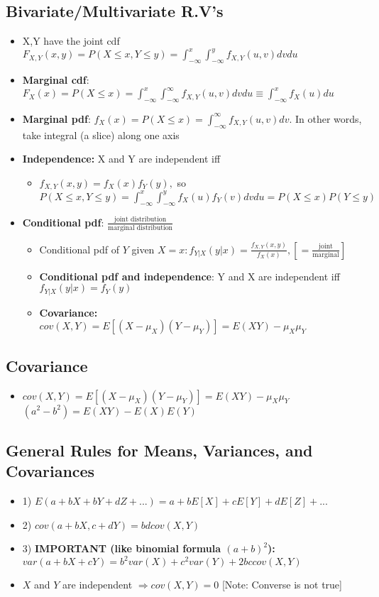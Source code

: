 \documentclass[10pt, oneside]{article}
\begin{document}
\subsection{Bivariate/Multivariate R.V's}
\begin{itemize}
    \item X,Y have the joint cdf $F_{X,Y}(x,y)=P(X\leq x, Y\leq y)=\int^{x}_{-\infty}\int^{y}_{-\infty} f_{X,Y} (u,v) dvdu$
    \item \textbf{Marginal cdf}: $F_X(x) =P(X\leq x)=\int _{-\infty} ^ x\int^{\infty}_{-\infty} f_{X,Y}(u,v)dvdu\equiv \int^{x}_{-\infty} f_X(u)du$
    \item \textbf{Marginal pdf}: $f_X(x) =P(X\leq x)=\int _{-\infty} ^ {\infty} f_{X,Y}(u,v)dv$. In other words, take integral (a slice) along one axis
    \item \textbf{Independence:} X and Y are independent iff
    \begin{itemize}
        \item $f_{X,Y} (x,y)=f_X(x) f_Y(y), $ so \\
        $P(X\leq x, Y\leq y) = \int^{x}_{-\infty}\int^{y}_{-\infty} f_X(u)f_Y(v) dvdu=P(X\leq x)P(Y\leq y)$
    \end{itemize}
    \item \textbf{Conditional pdf}: $\frac{\text{joint distribution}}{\text{marginal distribution}}$
    \begin{itemize}
        \item Conditional pdf of $Y$ given $X=x:f_{Y|X}(y|x) =\frac{f_{X,Y} (x,y)}{f_X (x)}, [=\frac{\text{joint}}{\text{marginal}}]$
        \item \textbf{Conditional pdf and independence}: Y and X are independent iff $f_{Y|X} (y|x) =f_Y (y)$
        \item \textbf{Covariance:} $cov(X,Y)=E[(X-\mu_X)(Y-\mu_Y)]=E(XY)-\mu_X\mu_Y$
    \end{itemize}
\end{itemize}
\subsection{Covariance}
\begin{itemize}
    \item $cov(X,Y)=E[(X-\mu_X)(Y-\mu_Y)]=E(XY)-\mu_X\mu_Y$ $(a^2-b^2) = E(XY) - E(X)E(Y)$
\end{itemize}

\subsection{General Rules for Means, Variances, and Covariances}
\begin{itemize}
    \item 1) $E(a+bX+bY+dZ+...)=a+bE[X]+cE[Y]+dE[Z]+...$
    \item 2) $cov(a+bX, c+dY)=bdcov(X,Y)$
    \item 3) \textbf{IMPORTANT (like binomial formula $(a+b)^2$):} $var(a+bX+cY)=b^2 var(X)+ c^2 var(Y)+2bccov(X,Y)$
    \item $X$ and $Y$ are independent $\Rightarrow cov(X,Y)=0$ [Note: Converse is not true]
\end{itemize}
\end{document}
